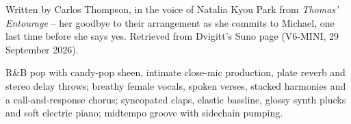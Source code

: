 
\begin{notes}
Written by Carlos Thompson, in the voice of Natalia Kyou Park from \emph{Thomas' Entourage} -- her goodbye to their arrangement as she commits to Michael, one last time before she says yes. Retrieved from Dvigitt's Suno page (V6-MINI, 29 September 2026).
\end{notes}
\begin{style}
R\&B pop with candy-pop sheen, intimate close-mic production, plate reverb and stereo delay throws; breathy female vocals, spoken verses, stacked harmonies and a call-and-response chorus; syncopated claps, elastic bassline, glossy synth plucks and soft electric piano; midtempo groove with sidechain pumping.
\end{style}
